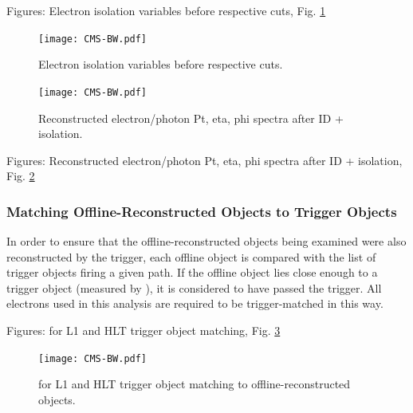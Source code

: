 Figures: Electron isolation variables before respective cuts, Fig. \ref{fig:ElecIsoVars}

 \begin{figure}[htb]
  \begin{center}
    \texttt{[image: CMS-BW.pdf]}
  \end{center}
  \caption[Electron isolation variables before respective cuts]{Electron isolation variables before respective cuts.}
  \label{fig:ElecIsoVars}
 \end{figure}



 \begin{figure}[htb]
  \begin{center}
    \texttt{[image: CMS-BW.pdf]}
  \end{center}
  \caption[Reconstructed electron/photon Pt, eta, phi spectra after ID + isolation]{Reconstructed electron/photon Pt, eta, phi spectra after ID + isolation.}
  \label{fig:RecoSpectraAfterEidEiso}
 \end{figure}

Figures: Reconstructed electron/photon Pt, eta, phi spectra after ID + isolation, Fig. \ref{fig:RecoSpectraAfterEidEiso}


\subsubsection{Matching Offline-Reconstructed Objects to Trigger Objects}
In order to ensure that the offline-reconstructed objects being examined were also reconstructed by the trigger, 
each offline object is compared with the list of trigger objects firing a given path.  
If the offline object lies close enough to a trigger object (measured by \DR), 
it is considered to have passed the trigger.  
All electrons used in this analysis are required to be trigger-matched in this way.  

Figures: \DR for L1 and HLT trigger object matching, Fig. \ref{fig:TriggerObjectSelectionDeltaR}

 \begin{figure}[htb]
  \begin{center}
    \texttt{[image: CMS-BW.pdf]}
  \end{center}
  \caption[\DR for L1 and HLT trigger object matching to offline for electron selection]{\DR for L1 and HLT trigger object matching to offline-reconstructed objects.}
  \label{fig:TriggerObjectSelectionDeltaR}
 \end{figure}


